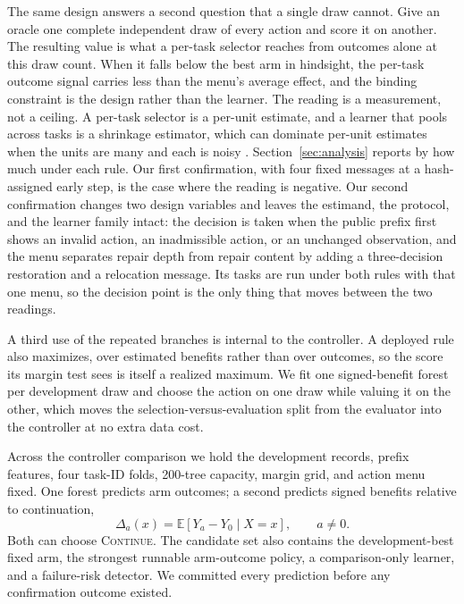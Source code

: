 \documentclass{article}
\begin{document}
The same design answers a second question that a single draw cannot. Give an oracle one complete independent draw of every action and score it on another. The resulting value is what a per-task selector reaches from outcomes alone at this draw count. When it falls below the best arm in hindsight, the per-task outcome signal carries less than the menu's average effect, and the binding constraint is the design rather than the learner. The reading is a measurement, not a ceiling. A per-task selector is a per-unit estimate, and a learner that pools across tasks is a shrinkage estimator, which can dominate per-unit estimates when the units are many and each is noisy \citep{efron1975stein}. Section~\ref{sec:analysis} reports by how much under each rule. Our first confirmation, with four fixed messages at a hash-assigned early step, is the case where the reading is negative. Our second confirmation changes two design variables and leaves the estimand, the protocol, and the learner family intact: the decision is taken when the public prefix first shows an invalid action, an inadmissible action, or an unchanged observation, and the menu separates repair depth from repair content by adding a three-decision restoration and a relocation message. Its tasks are run under both rules with that one menu, so the decision point is the only thing that moves between the two readings.

A third use of the repeated branches is internal to the controller. A deployed rule also maximizes, over estimated benefits rather than over outcomes, so the score its margin test sees is itself a realized maximum. We fit one signed-benefit forest per development draw and choose the action on one draw while valuing it on the other, which moves the selection-versus-evaluation split from the evaluator into the controller at no extra data cost.

Across the controller comparison we hold the development records, prefix features, four task-ID folds, 200-tree capacity, margin grid, and action menu fixed. One forest predicts arm outcomes; a second predicts signed benefits relative to continuation,
\begin{equation}
\Delta_a(x)=\mathbb{E}[Y_a-Y_0\mid X=x],\qquad a\neq0.
\end{equation}
Both can choose \textsc{Continue}. The candidate set also contains the development-best fixed arm, the strongest runnable arm-outcome policy, a comparison-only learner, and a failure-risk detector. We committed every prediction before any confirmation outcome existed.
\end{document}
